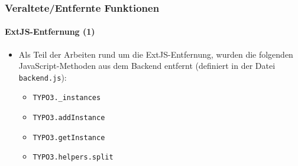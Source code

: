 \begin{frame}[fragile]
	\frametitle{Veraltete/Entfernte Funktionen}
	\framesubtitle{ExtJS-Entfernung (1)}

	\begin{itemize}
		\item Als Teil der Arbeiten rund um die ExtJS-Entfernung, wurden die folgenden JavaScript-Methoden aus dem Backend entfernt (definiert in der Datei \texttt{backend.js}):

		\begin{itemize}
			\item \texttt{TYPO3.\_instances}
			\item \texttt{TYPO3.addInstance}
			\item \texttt{TYPO3.getInstance}
			\item \texttt{TYPO3.helpers.split}
		\end{itemize}

	\end{itemize}

\end{frame}

